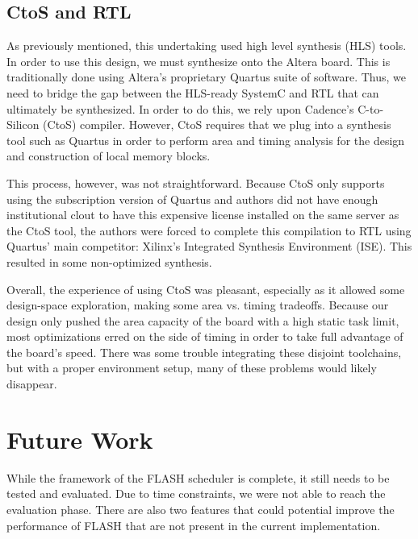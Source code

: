 \documentclass{sig-alternate-10pt}
\begin{document}
\subsection{CtoS and RTL}
As previously mentioned, this undertaking used high level synthesis (HLS)
tools.  In order to use this design, we must synthesize onto the Altera
board.  This is traditionally done using Altera's proprietary Quartus suite
of software.  Thus, we need to bridge the gap between the HLS-ready SystemC
and RTL that can ultimately be synthesized.  In order to do this, we rely
upon Cadence's C-to-Silicon (CtoS) compiler.  However, CtoS requires that we
plug into a synthesis tool such as Quartus in order to perform area and
timing analysis for the design and construction of local memory blocks.

This process, however, was not straightforward.  Because CtoS only supports
using the subscription version of Quartus and authors did not have enough
institutional clout to have this expensive license installed on the same
server as the CtoS tool, the authors were forced to complete this
compilation to RTL using Quartus' main competitor: Xilinx's Integrated
Synthesis Environment (ISE).  This resulted in some non-optimized synthesis.

Overall, the experience of using CtoS was pleasant, especially as it allowed
some design-space exploration, making some area vs. timing tradeoffs.
Because our design only pushed the area capacity of the board with a high
static task limit, most optimizations erred on the side of timing in order
to take full advantage of the board's speed.  There was some trouble
integrating these disjoint toolchains, but with a proper environment setup,
many of these problems would likely disappear.


\section{Future Work}
\label{sec:future}
While the framework of the FLASH scheduler is complete, it still needs to be tested and evaluated. Due to time constraints, we were not able to reach the evaluation phase. There are also two features that could potential improve the performance of FLASH that are not present in the current implementation.
\end{document}
